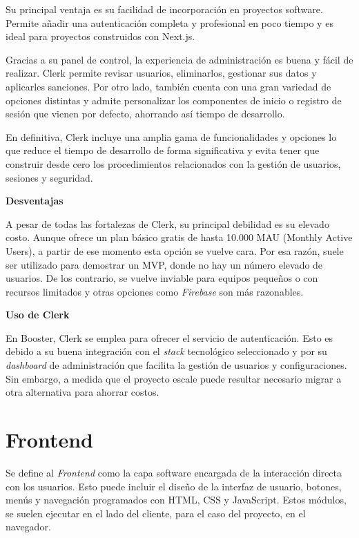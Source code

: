 Su principal ventaja es su facilidad de incorporación en proyectos software. Permite añadir una autenticación completa y profesional en poco tiempo y es ideal para proyectos construidos con Next.js.

Gracias a su panel de control, la experiencia de administración es buena y fácil de realizar. Clerk permite revisar usuarios, eliminarlos, gestionar sus datos y aplicarles sanciones. Por otro lado, también cuenta con una gran variedad de opciones distintas y admite personalizar los componentes de inicio o registro de sesión que vienen por defecto, ahorrando así tiempo de desarrollo. 

En definitiva, Clerk incluye una amplia gama de funcionalidades y opciones lo que reduce el tiempo de desarrollo de forma significativa y evita tener que construir desde cero los procedimientos relacionados con la gestión de usuarios, sesiones y seguridad. 

\textbf{Desventajas}

A pesar de todas las fortalezas de Clerk, su principal debilidad es su elevado costo. Aunque ofrece un plan básico gratis de hasta 10.000 MAU (Monthly Active Users), a partir de ese momento esta opción se vuelve cara. Por esa razón, suele ser utilizado para demostrar un MVP, donde no hay un número elevado de usuarios. De los contrario, se vuelve inviable para equipos pequeños o con recursos limitados y otras opciones como \textit{Firebase} son más razonables.

\textbf{Uso de Clerk}

En Booster, Clerk se emplea para ofrecer el servicio de autenticación. Esto es debido a su buena integración con el \textit{stack} tecnológico seleccionado y por su \textit{dashboard} de administración que facilita la gestión de usuarios y configuraciones. Sin embargo, a medida que el proyecto escale puede resultar necesario migrar a otra alternativa para ahorrar costos. 


\section{Frontend}

Se define al \textit{Frontend} como la capa software encargada de la interacción directa con los usuarios. Esto puede incluir el diseño de la interfaz de usuario, botones, menús y navegación programados con HTML, CSS y JavaScript. Estos módulos, se suelen ejecutar en el lado del cliente, para el caso del proyecto, en el navegador. 

